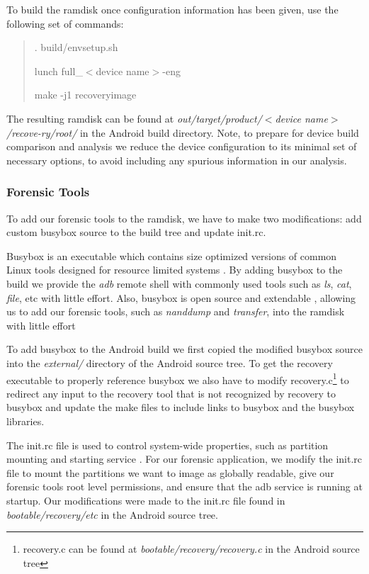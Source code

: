 To build the ramdisk once configuration information has been given, use the following set of commands:
\begin{quotation}
. build/envsetup.sh

lunch full\_$<$device name$>$-eng

make -j1 recoveryimage
\end{quotation}

The resulting ramdisk can be found at \emph{out/target/product/$<$device name$>$/recove-}\emph{ry/root/} in the Android build directory.  Note, to prepare for device build comparison and analysis we reduce the device configuration to its minimal set of necessary options, to avoid including any spurious information in our analysis.

\subsubsection{Forensic Tools}
\label{sec:forensic_tools}

To add our forensic tools to the ramdisk, we have to make two modifications: add custom busybox source to the build tree and update init.rc.

Busybox is an executable which contains size optimized versions of common Linux tools designed for resource limited systems \cite{busybox_about}.  By adding busybox to the build we provide the \emph{adb} remote shell with commonly used tools such as \emph{ls}, \emph{cat}, \emph{file}, etc with little effort.  Also, busybox is open source and extendable \cite{add_to_busybox}, allowing us to add our forensic tools, such as \emph{nanddump} and \emph{transfer}, into the ramdisk with little effort

To add busybox to the Android build we first copied the modified busybox source into the \emph{external/} directory of the Android source tree.  To get the recovery executable to properly reference busybox we also have to modify recovery.c\footnote{recovery.c can be found at \emph{bootable/recovery/recovery.c} in the Android source tree} to redirect any input to the recovery tool that is not recognized by recovery to busybox and update the make files to include links to busybox and the busybox libraries.

The init.rc file is used to control system-wide properties, such as partition mounting and starting service \cite{rootzwiki_unpack}.  For our forensic application, we modify the init.rc file to mount the partitions we want to image as globally readable, give our forensic tools root level permissions, and ensure that the adb service is running at startup. Our modifications were made to the init.rc file found in \emph{bootable/recovery/etc} in the Android source tree.

